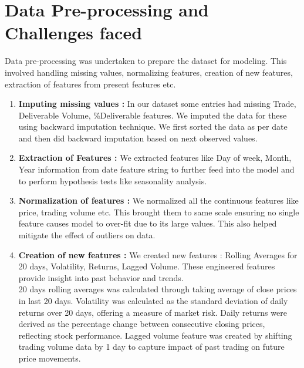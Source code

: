 \documentclass[conference]{IEEEtran}
\begin{document}
\section{Data Pre-processing and Challenges faced}
Data pre-processing was undertaken to prepare the dataset for modeling. This involved handling missing values, normalizing features, creation of new features, extraction of features from present features etc.
\\
\begin{enumerate}
    \item \textbf{Imputing missing values : }
        In our dataset some entries had missing Trade, Deliverable Volume, \%Deliverable features. We imputed the data for these using backward imputation technique. We first sorted the data as per date and then did backward imputation based on next observed values.
    \\
    \item \textbf{Extraction of Features : }
        We extracted features like Day of week, Month, Year information from date feature string to further feed into the model and to perform hypothesis tests like seasonality analysis.
    \\
    \item \textbf{Normalization of features : }
        We normalized all the continuous features like price, trading volume etc. This brought them to same scale ensuring no single feature causes model to over-fit due to its large values. This also helped mitigate the effect of outliers on data.
    \\
    \item \textbf{Creation of new features : }
        We created new features : Rolling Averages for 20 days, Volatility, Returns, Lagged Volume. These engineered features provide insight into past behavior and trends. \\20 days rolling averages was calculated through taking average of close prices in last 20 days. Volatility was calculated as the standard deviation of daily returns over 20 days, offering a measure of market risk. Daily returns were derived as the percentage change between consecutive closing prices, reflecting stock performance. Lagged volume feature was created by shifting trading volume data by 1 day to capture impact of past trading on future price movements.
\end{enumerate}
\end{document}
